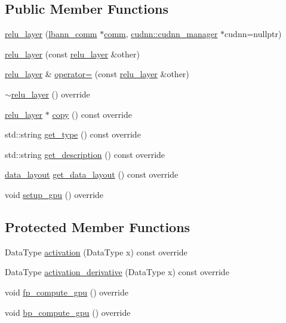 \subsection*{Public Member Functions}
\begin{DoxyCompactItemize}
\item 
\hyperlink{classlbann_1_1relu__layer_af4739658d074a62cd71ce0ca7e791c06}{relu\+\_\+layer} (\hyperlink{classlbann_1_1lbann__comm}{lbann\+\_\+comm} $\ast$\hyperlink{file__io_8cpp_ab048c6f9fcbcfaa57ce68b00263dbebe}{comm}, \hyperlink{classlbann_1_1cudnn_1_1cudnn__manager}{cudnn\+::cudnn\+\_\+manager} $\ast$cudnn=nullptr)
\item 
\hyperlink{classlbann_1_1relu__layer_a0f0463a71fa389c6273a035d3ae4dbf6}{relu\+\_\+layer} (const \hyperlink{classlbann_1_1relu__layer}{relu\+\_\+layer} \&other)
\item 
\hyperlink{classlbann_1_1relu__layer}{relu\+\_\+layer} \& \hyperlink{classlbann_1_1relu__layer_a455500a9ee8e9fbef2db3d8943e65d7d}{operator=} (const \hyperlink{classlbann_1_1relu__layer}{relu\+\_\+layer} \&other)
\item 
\hyperlink{classlbann_1_1relu__layer_a86024c01b02a5ddbe8de3c4c264d45fa}{$\sim$relu\+\_\+layer} () override
\item 
\hyperlink{classlbann_1_1relu__layer}{relu\+\_\+layer} $\ast$ \hyperlink{classlbann_1_1relu__layer_af17be85b90887cf3d413fd21e7e20b5c}{copy} () const override
\item 
std\+::string \hyperlink{classlbann_1_1relu__layer_afcf519aa5e19169c2b7a71aa0ee16aae}{get\+\_\+type} () const override
\item 
std\+::string \hyperlink{classlbann_1_1relu__layer_a57d00fb2f9c90f5132ddea44d3ccc099}{get\+\_\+description} () const override
\item 
\hyperlink{base_8hpp_a786677cbfb3f5677b4d84f3056eb08db}{data\+\_\+layout} \hyperlink{classlbann_1_1relu__layer_a1d0b9cb9fc976c2c4375d9422a1ac112}{get\+\_\+data\+\_\+layout} () const override
\item 
void \hyperlink{classlbann_1_1relu__layer_a9426317aa741ab8a202ee52cf5250b59}{setup\+\_\+gpu} () override
\end{DoxyCompactItemize}
\subsection*{Protected Member Functions}
\begin{DoxyCompactItemize}
\item 
Data\+Type \hyperlink{classlbann_1_1relu__layer_a24c9b5e006e4a0b3f8992c1c44ce9ba5}{activation} (Data\+Type x) const override
\item 
Data\+Type \hyperlink{classlbann_1_1relu__layer_a70cbfb59155a255b1422995875868790}{activation\+\_\+derivative} (Data\+Type x) const override
\item 
void \hyperlink{classlbann_1_1relu__layer_a682fbf36187cb7f985581b5d4095ae14}{fp\+\_\+compute\+\_\+gpu} () override
\item 
void \hyperlink{classlbann_1_1relu__layer_a236d3e3c92376465d79104703bc8b005}{bp\+\_\+compute\+\_\+gpu} () override
\end{DoxyCompactItemize}
